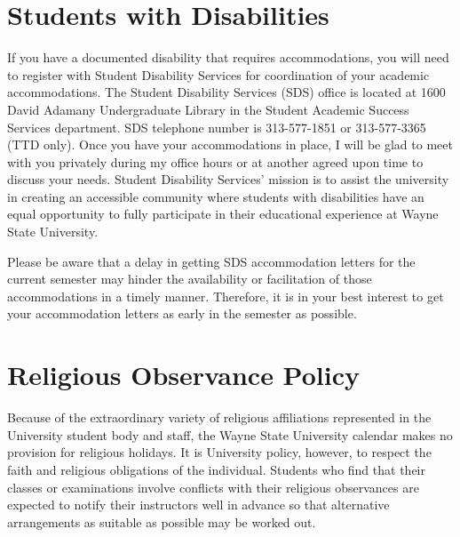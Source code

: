 \newpage

\section*{Students with Disabilities}
If you have a documented disability that requires accommodations, you will need to register with Student Disability Services for coordination of your academic accommodations. 
The Student Disability Services (SDS) office is located at 1600 David Adamany Undergraduate Library in the Student Academic Success Services department. 
SDS telephone number is 313-577-1851 or 313-577-3365 (TTD only). 
Once you have your accommodations in place, I will be glad to meet with you privately during my office hours or at another agreed upon time to discuss your needs. 
Student Disability Services' mission is to assist the university in creating an accessible community where students with disabilities have an equal opportunity to fully participate in their educational experience at Wayne State University.
\par
Please be aware that a delay in getting SDS accommodation letters for the current semester may hinder the availability or facilitation of those accommodations in a timely manner.
Therefore, it is in your best interest to get your accommodation letters as early in the semester as possible.

\section*{Religious Observance Policy}
Because of the extraordinary variety of religious affiliations represented in the University student body and staff, the Wayne State University calendar makes no provision for religious holidays.
It is University policy, however, to respect the faith and religious obligations of the individual.
Students who find that their classes or examinations involve conflicts with their religious observances are expected to notify their instructors well in advance so that alternative arrangements as suitable as possible may be worked out.

